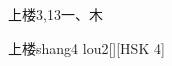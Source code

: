 \begin{entry}{上楼}{3,13}{⼀、⽊}
  \begin{phonetics}{上楼}{shang4 lou2}[][HSK 4]
  \end{phonetics}
\end{entry}
